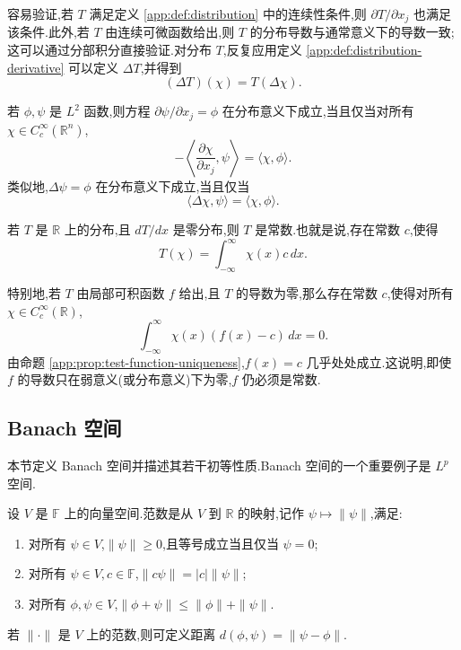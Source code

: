 容易验证,若 \(T\) 满足定义 \ref{app:def:distribution} 中的连续性条件,则 \(\partial T/\partial x_j\) 也满足该条件.此外,若 \(T\) 由连续可微函数给出,则 \(T\) 的分布导数与通常意义下的导数一致;这可以通过分部积分直接验证.对分布 \(T\),反复应用定义 \ref{app:def:distribution-derivative} 可以定义 \(\Delta T\),并得到
\[
(\Delta T)(\chi)=T(\Delta\chi).
\]

\begin{proposition}\label{app:prop:distribution-L2}
若 \(\phi,\psi\) 是 \(L^2\) 函数,则方程 \(\partial\psi/\partial x_j=\phi\) 在分布意义下成立,当且仅当对所有 \(\chi\in C_c^\infty(\mathbb R^n)\),
\[
-\left\langle\frac{\partial\chi}{\partial x_j},\psi\right\rangle
=\langle\chi,\phi\rangle.
\]
类似地,\(\Delta\psi=\phi\) 在分布意义下成立,当且仅当
\[
\langle\Delta\chi,\psi\rangle=\langle\chi,\phi\rangle.
\]
\end{proposition}

\begin{proposition}\label{app:prop:distribution-constant}
若 \(T\) 是 \(\mathbb R\) 上的分布,且 \(dT/dx\) 是零分布,则 \(T\) 是常数.也就是说,存在常数 \(c\),使得
\[
T(\chi)=\int_{-\infty}^{\infty}\chi(x)c\,dx.\tag{A.5}
\]
\end{proposition}

特别地,若 \(T\) 由局部可积函数 \(f\) 给出,且 \(T\) 的导数为零,那么存在常数 \(c\),使得对所有 \(\chi\in C_c^\infty(\mathbb R)\),
\[
\int_{-\infty}^{\infty}\chi(x)(f(x)-c)\,dx=0.
\]
由命题 \ref{app:prop:test-function-uniqueness},\(f(x)=c\) 几乎处处成立.这说明,即使 \(f\) 的导数只在弱意义(或分布意义)下为零,\(f\) 仍必须是常数.

\subsection{Banach 空间}\label{app:subsec:banach}

本节定义 Banach 空间并描述其若干初等性质.Banach 空间的一个重要例子是 \(L^p\) 空间.

\begin{definition}[范数]\label{app:def:norm}
设 \(V\) 是 \(\mathbb F\) 上的向量空间.范数是从 \(V\) 到 \(\mathbb R\) 的映射,记作 \(\psi\mapsto\|\psi\|\),满足:
\begin{enumerate}
  \item 对所有 \(\psi\in V\),\(\|\psi\|\ge0\),且等号成立当且仅当 \(\psi=0\);
  \item 对所有 \(\psi\in V,c\in\mathbb F\),\(\|c\psi\|=|c|\|\psi\|\);
  \item 对所有 \(\phi,\psi\in V\),\(\|\phi+\psi\|\le\|\phi\|+\|\psi\|\).
\end{enumerate}
若 \(\|\cdot\|\) 是 \(V\) 上的范数,则可定义距离 \(d(\phi,\psi)=\|\psi-\phi\|\).
\end{definition}

